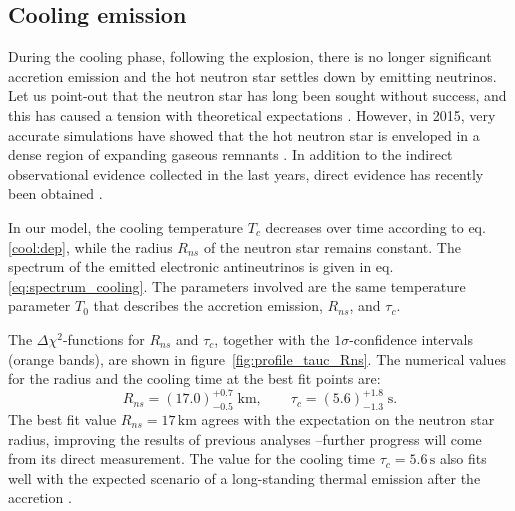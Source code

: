 \documentclass[a4paper,11pt]{article}
\begin{document}
\subsection{Cooling emission}
\label{subsec:cooling_emission}
During the cooling phase, following the explosion, there is no longer significant accretion emission and the hot neutron star settles down by emitting neutrinos. Let us point-out that the  neutron star has long been sought without success, and this has caused a tension with theoretical expectations \cite{Shternin}. However, 
in 2015, very accurate simulations have showed that the hot neutron star is enveloped in a dense region of expanding gaseous remnants \cite{Orlando}.
 In addition to the indirect observational evidence  collected in the last years, direct evidence has recently been obtained \cite{Fransson:2024csf}.
 

In our model, the cooling temperature $T_c$ decreases over time according to eq. \eqref{cool:dep}, while the radius $R_{ns}$ of the neutron star remains constant. 
The spectrum of the emitted electronic antineutrinos is given in eq.\,\eqref{eq:spectrum_cooling}. The  parameters involved are the same temperature parameter $T_0$ that describes the accretion emission,  $R_{ns}$,  and $\tau_c$. 

The $\Delta \chi^2$-functions for $R_{ns}$ and $\tau_c$, together with the $1\sigma$-confidence intervals (orange bands), are shown in figure~\ref{fig:profile_tauc_Rns}. 
The numerical values for the radius and the cooling time at the best fit points are:
\begin{equation}
    R_{ns}=(17.0)^{+0.7}_{-0.5}\;\unit{\km},  \qquad \tau_c=(5.6)^{+1.8}_{-1.3}\;\unit{\s}.
    \label{eq:cooling_best_fit}
\end{equation}
The best fit value $R_{ns}=17\,\mbox{km}$ agrees with the expectation on the neutron star radius, improving the results of  previous analyses \cite{Loredo:2001rx,Pagliaroli:2008ur}--further %
progress will come from its direct measurement. 
%
 The value for the cooling time $\tau_c=5.6\,\mbox{s}$ also fits well with the expected scenario of a long-standing thermal emission after the accretion \cite{Loredo:2001rx, Pagliaroli:2008ur}.
 
\end{document}
